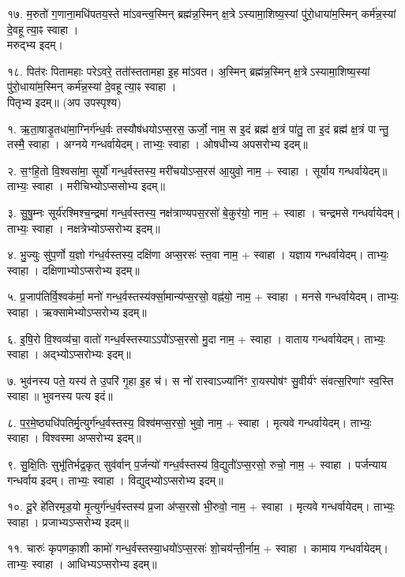 १७. म॒रुतो॑ ग॒णाना॒मधि॑पतय॒स्ते मा॑ऽवन्त्व॒स्मिन् ब्रह्म॑न्न॒स्मिन् क्ष॒त्रेऽस्यामा॒शिष्य॒स्यां पु॑रो॒धाया॑म॒स्मिन् कर्म॑न्न॒स्यां दे॒वहूत्या॒ꣴ स्वाहा।\\
मरुद्भ्य इदम्।

१८. पित॑रः पितामहाः परेऽवरे॒ तता॑॑स्ततामहा इ॒ह मा॑ऽवत। अ॒स्मिन् ब्रह्म॑न्न॒स्मिन् क्ष॒त्रेऽस्यामा॒शिष्य॒स्यां पु॑रो॒धाया॑म॒स्मिन् कर्म॑न्न॒स्यां दे॒वहूत्या॒ꣴ स्वाहा।\\
पितृभ्य इदम्॥ (अप उपस्पृश्य)


१. ऋ॒ता॒षाडृ॒तधा॑मा॒ग्निर्ग॑न्ध॒र्वः तस्यौष॑धयोऽप्स॒रस॒ ऊर्जो॒ नाम॒
स इ॒दं ब्रह्म॑ क्ष॒त्रं पा॑तु॒ ता इ॒दं ब्रह्म॑ क्ष॒त्रं पान्तु॒ तस्मै॒ स्वाहा। 
अग्नये गन्धर्वायेदम्। ताभ्यः॒ स्वाहा। ओषधीभ्य अपसरोभ्य इदम्॥

२. स॒ꣳहि॒तो वि॒श्वसा॑मा॒ सूर्यो॑ गन्ध॒र्वस्तस्य॒ मरी॑चयोऽप्स॒रस॑ आ॒युवो॒ नाम॒ + स्वाहा।
सूर्याय गन्धर्वायेदम्॥ ताभ्यः॒ स्वाहा। मरीचिभ्योऽप्ससोभ्य इदम्॥

३. सु॒षु॒म्नः सूर्य॑रश्मिश्च॒न्द्रमा॑ गन्ध॒र्वस्तस्य॒ नक्ष॑त्राण्यपस॒रसो॑ बे॒कुर॑यो॒ नाम॒ + स्वाहा।
चन्द्रमसे गन्धर्वायेदम्। ताभ्यः॒ स्वाहा। नक्षत्रेभ्योऽप्सरोभ्य इदम्॥

४. भु॒ज्युः सु॑प॒र्णो य॒ज्ञो ग॑न्ध॒र्वस्तस्य॒ दक्षि॑णा अप्स॒रसः॑ स्त॒वा नाम॒ + स्वाहा।
यज्ञाय गन्धर्वायेदम्। ताभ्यः॒ स्वाहा। दक्षिणाभ्योऽप्सरोभ्य इदम्॥

५. प्र॒जाप॑तिर्वि॒श्वक॑र्मा॒ मनो॑ गन्ध॒र्वस्तस्य॑र्क्सा॒मान्य॑प्स॒रसो॒ वह्न॑यो॒ नाम॒ + स्वाहा।
मनसे गन्धर्वायेदम्। ताभ्यः॒ स्वाहा। ऋक्सामेभ्योऽप्सरोभ्य इदम्॥

६. इ॒षि॒रो वि॒श्वव्य॑चा॒ वातो॑ गन्ध॒र्वस्तस्याऽऽपो॑॑ऽप्स॒रसो मु॒दा नाम॒ + स्वाहा।
वाताय गन्धर्वायेदम्। ताभ्यः॒ स्वाहा। अद्भ्योऽप्सरोभ्यः इदम्॥

७. भुव॑नस्य पते॒ यस्य॑ ते उ॒परि॑ गृ॒हा इ॒ह च॑।
स नो॑ रास्वाऽज्या॑निंꣳ रा॒यस्पोष॑ꣳ सु॒वीर्य॑ꣳ संवत्स॒रिणा॑ꣳ स्व॒स्ति स्वाहा॥ भुवनस्य पत्य इदं॥

८. प॒र॒मे॒ष्ठ्यधि॑पतिर्मृ॒त्युर्ग॑न्ध॒र्वस्तस्य॒ विश्व॑मप्स॒रसो॒ भुवो॒ नाम॒ + स्वाहा।
मृत्यवे गन्धर्वायेदम्। ताभ्यः॒ स्वाहा। विश्वस्मा अप्सरोभ्य इदम्॥

९. सु॒क्षि॒तिः सुभू॑तिर्भद्र॒कृत् सुव॑र्वान् प॒र्जन्यो॑ गन्ध॒र्वस्तस्य॑ वि॒द्युतो॑॑ऽप्स॒रसो॒ रुचो॒ नाम॒ + स्वाहा। पर्जन्याय गन्धर्वाय इदम्। ताभ्यः॒ स्वाहा। विद्युद्भ्योऽप्सरोभ्य इदम्॥

१०. दू॒रे हे॑तिरमृड॒यो मृ॒त्युर्ग॑न्ध॒र्वस्तस्य॑ प्र॒जा अ॑प्स॒रसो भी॒रुवो॒ नाम॒ + स्वाहा।
मृत्यवे गन्धर्वायेदम्। ताभ्यः॒ स्वाहा। प्रजाभ्यऽप्सरोभ्य इदम्॥

११. चारुः॑ कृपणका॒शी कामो॑ गन्ध॒र्वस्तस्या॒धयो॑॑ऽप्स॒रसः॑ शो॒चय॑न्ती॒र्नाम॒ + स्वाहा।
कामाय गन्धर्वायेदम्। ताभ्यः॒ स्वाहा। आधिभ्यऽप्सरोभ्य इदम्॥

